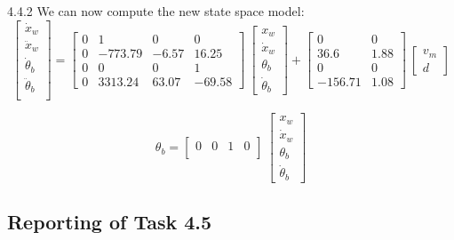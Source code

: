\documentclass[11pt]{article}
\begin{document}
4.4.2 We can now compute the new state space model:
\begin{equation*}
\begin{bmatrix}
	\dot x_w\\
     \ddot x_w\\
     \dot \theta_b\\
	\ddot \theta_b\\
	\end{bmatrix}
=
\begin{bmatrix}
0 & 1 & 0 & 0 \\
0 & -773.79 & -6.57 & 16.25 \\
0 & 0 & 0 & 1 \\
0 & 3313.24 & 63.07 & -69.58
\end{bmatrix}
\
\begin{bmatrix}
	x_w\\
	\dot x_w\\
	\theta_b\\
	\dot \theta_b
	\end{bmatrix}
+
\begin{bmatrix}
0 & 0 \\
36.6 & 1.88 \\
0 & 0\\
-156.71 & 1.08
\end{bmatrix}
\
\begin{bmatrix}
v_m \\
d
\end{bmatrix}
\end{equation*}

\begin{equation*}
\theta_b = 
\begin{bmatrix}
0 & 0 & 1 & 0\\
\end{bmatrix}
\
\begin{bmatrix}
	x_w\\
	\dot x_w\\
	\theta_b\\
	\dot \theta_b
	\end{bmatrix}
\end{equation*}


\subsection*{Reporting of Task 4.5}
\end{document}
